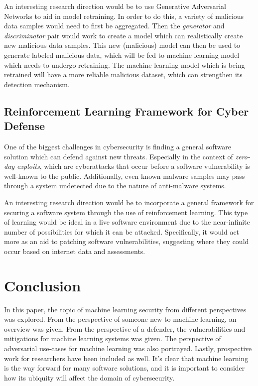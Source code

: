 \documentclass[11pt,conference]{IEEEtran}
\begin{document}
An interesting research direction would be to use Generative Adversarial
Networks to aid in model retraining. In order to do this, a
variety of malicious data samples would need to first be aggregated. Then the
\emph{generator} and \emph{discriminator} pair would work to create a model
which can realistically create new malicious data samples. This new (malicious)
model can then be used to generate labeled malicious data, which will be fed to
machine learning model which needs to undergo retraining. The machine learning
model which is being retrained will have a more reliable malicious dataset,
which can strengthen its detection mechanism.

\subsection{Reinforcement Learning Framework for Cyber Defense}
One of the biggest challenges in cybersecurity is finding a general software
solution which can defend against new threats. Especially in the
context of \emph{zero-day exploits}, which are cyberattacks that occur before a
software vulnerability is well-known to the public. Additionally, even known
malware samples may pass through a system undetected due to the nature of
anti-malware systems.

An interesting research direction would be to incorporate a general framework
for securing a software system through the use of reinforcement learning. This
type of learning would be ideal in a live software environment due to the
near-infinite number of possibilities for which it can be attacked. Specifically, it
would act more as an aid to patching software vulnerabilities, suggesting where
they could occur based on internet data and assessments.

\section{Conclusion}
In this paper, the topic of machine learning security from different
perspectives was explored. From the perspective of someone new to machine
learning, an overview was given. From the perspective of a defender, the
vulnerabilities and mitigations for machine learning systems was given. The
perspective of adversarial use-cases for machine learning was also portrayed. Lastly,
prospective work for researchers have been included as well. It's clear that
machine learning is the way forward for many software solutions, and it is
important to consider how its ubiquity will affect the domain of cybersecurity. 
\end{document}
